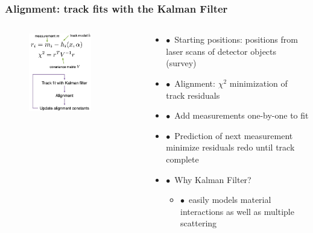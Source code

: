 \documentclass[aspectratio=1610, 12pt, xcolor=dvipsnames]{beamer}
\begin{document}
\begin{frame}\frametitle{Alignment: track fits with the Kalman Filter}
  \begin{columns}
    \begin{column}[c]{0.4\textwidth}
      \begin{figure}
        \centering
        \includegraphics[width=0.72\textwidth]{logos/kalman.png}
      \end{figure}
    \end{column}
    \begin{column}[c]{0.55\textwidth}
      \begin{itemize}
        \item $\bullet$\, Starting positions: positions from laser scans of detector objects (survey)
        \item $\bullet$\, Alignment: $\chi^2$ minimization of track residuals
        \item $\bullet$\, Add measurements one-by-one to fit
        \item $\bullet$\, Prediction of next measurement \to minimize residuals \to redo until track complete
        \item $\bullet$\, Why Kalman Filter?
        \begin{itemize}
          \item $\bullet$\, easily models material interactions as well as multiple scattering
        \end{itemize}
      \end{itemize}
    \end{column}
  \end{columns}
\end{frame}
\end{document}
